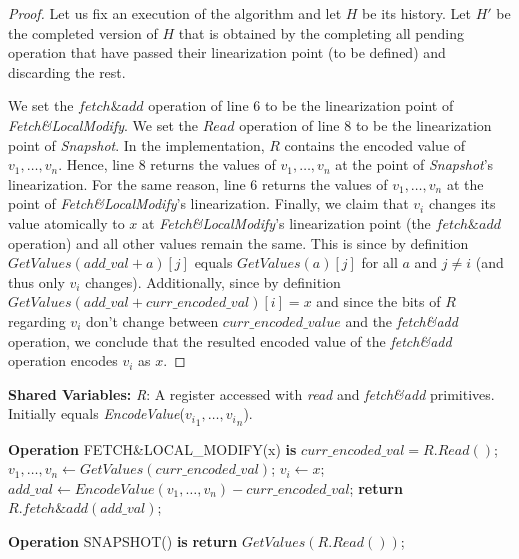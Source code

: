 \documentclass[11pt]{article}
\theoremstyle{definition}
\begin{document}
\begin{proof}
    Let us fix an execution of the algorithm and let $H$ be its history. Let $H'$ be the completed version of $H$ that is obtained by the completing all pending operation that have passed their linearization point (to be defined) and discarding the rest. 
    
    We set the $fetch\&add$ operation of line 6 to be the linearization point of \textit{Fetch\&LocalModify}. We set the $Read$ operation of line 8 to be the linearization point of \textit{Snapshot}. In the implementation, $R$ contains the encoded value of $v_1,\ldots,v_n$. Hence, line 8 returns the values of $v_1,\ldots,v_n$ at the point of \textit{Snapshot}'s linearization. For the same reason, line 6 returns the values of $v_1,\ldots,v_n$ at the point of \textit{Fetch\&LocalModify}'s linearization. Finally, we claim that $v_i$ changes its value atomically to $x$ at \textit{Fetch\&LocalModify}'s linearization point (the $fetch\&add$ operation) and all other values remain the same. This is since by definition $GetValues(add\_val + a)[j]$ equals $GetValues(a)[j]$ for all $a$ and $j\neq i$ (and thus only $v_i$ changes). Additionally, since by definition $GetValues(add\_val + curr\_encoded\_val)[i]=x$ and since the bits of $R$ regarding $v_i$ don't change between $curr\_encoded\_value$ and the \textit{fetch\&add} operation, we conclude that the resulted encoded value of the \textit{fetch\&add} operation encodes $v_i$ as $x$. 
\end{proof}

\begin{algorithm}
    \caption{A wait-free implementation of \textit{snapshot\&modify} only a register that supports operations $swap$ and $fetch\&add$.}
    \label{alg:sm}
    \begin{algorithmic}[1]
          
    \Statex \textbf{Shared Variables:}
    \Statex \hspace{1em} \textit{R}: A register accessed with \textit{read} and \textit{fetch\&add} primitives. Initially equals \mbox{\textit{EncodeValue}(${v_i}_1,\ldots,{v_i}_n$)}.
    
    \Statex
     \State \textbf{Operation} FETCH\&LOCAL\_MODIFY(x) \textbf{is}  \hfill {}
     \State $curr\_encoded\_val = R.Read()$;
     \State $v_1,\ldots,v_n \leftarrow GetValues(curr\_encoded\_val)$;
     \State $v_i \leftarrow x$;
     \State $add\_val \leftarrow EncodeValue(v_1,\ldots,v_n) - curr\_encoded\_val$;
     \State \textbf{return} $R.fetch\&add(add\_val)$;

     \Statex
     \State \textbf{Operation} SNAPSHOT() \textbf{is}
     \State \textbf{return} $GetValues(R.Read())$;
    \end{algorithmic}
\end{algorithm}
\end{document}
